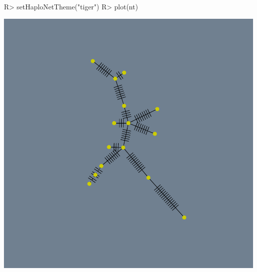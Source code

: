 \documentclass[a4paper]{article}
\begin{document}
\begin{Schunk}
\begin{Sinput}
R> setHaploNetTheme("tiger")
R> plot(nt)
\end{Sinput}
\end{Schunk}
\includegraphics{PlotHaploNet-007}
\end{document}

